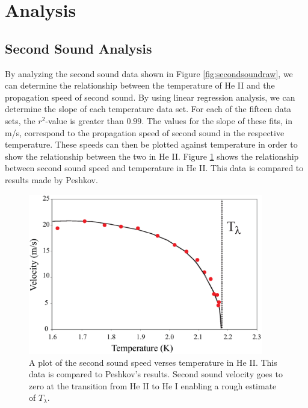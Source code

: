 
\section{Analysis}\label{analysis}
\subsection{Second Sound Analysis}\label{secondsoundanalysis}

By analyzing the second sound data shown in Figure \ref{fig:secondsoundraw}, we can determine the relationship between the temperature of He II and the propagation speed of second sound.  By using linear regression analysis, we can determine the slope of each temperature data set.  For each of the fifteen data sets, the $r^{2}$-value is greater than $0.99$.  The values for the slope of these fits, in m/s, correspond to the propagation speed of second sound in the respective temperature.  These speeds can then be plotted against temperature in order to show the relationship between the two in He II.  Figure \ref{fig:secondsound} shows the relationship between second sound speed and temperature in He II.  This data is compared to results made by Peshkov.\cite{peshkov}

\begin{figure}[htbp]
\begin{center}
\includegraphics[height=70mm]{./figures/secondsound.eps}
\caption{\small{A plot of the second sound speed verses temperature in He II.  This data is compared to Peshkov's results.\cite{peshkov} Second sound velocity goes to zero at the transition from He II to He I enabling a rough estimate of $T_{\lambda}$.}}
\label{fig:secondsound}
\end{center}
\end{figure}

